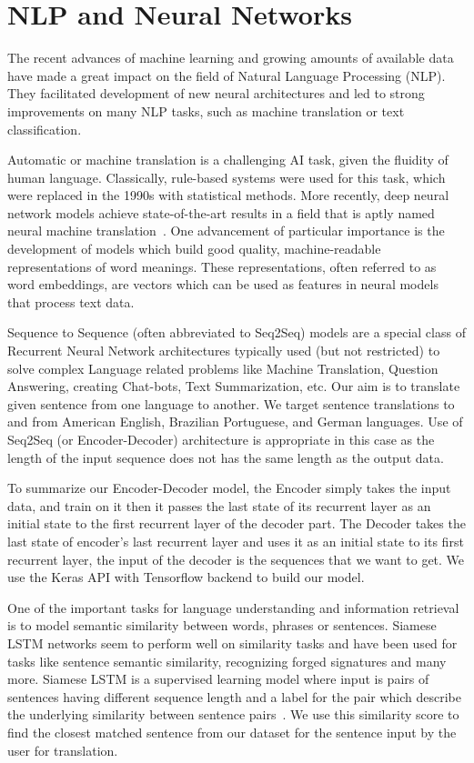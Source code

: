 \documentclass[runningheads]{llncs}
\begin{document}
	\section{NLP and Neural Networks}
	The recent advances of machine learning and growing amounts of available data have made a great impact on the field of  Natural Language Processing (NLP). They facilitated development of new neural architectures and led to strong improvements on many NLP tasks, such as machine translation or text classification. 
	
	Automatic or machine translation is a challenging AI task, given the fluidity of human language. Classically, rule-based systems were used for this task, which were replaced in the 1990s with statistical methods. More recently, deep neural network models achieve state-of-the-art results in a field that is aptly named neural machine translation~\cite{ref_url6}.
	One advancement of particular importance is the development of models which build good quality, machine-readable representations of word meanings. These representations, often referred to as word embeddings, are vectors which can be used as features in neural models that process text data.
	
	Sequence to Sequence (often abbreviated to Seq2Seq) models are a special class of Recurrent Neural Network architectures typically used (but not restricted) to solve complex Language related problems like Machine Translation, Question Answering, creating Chat-bots, Text Summarization, etc. Our aim is to translate given sentence from one language to another. We target sentence translations to and from American English, Brazilian Portuguese, and German languages. Use of Seq2Seq (or Encoder-Decoder) architecture is appropriate in this case as the length of the input sequence  does not has the same length as the output data.
	
	To summarize our Encoder-Decoder model, the Encoder simply takes the input data, and train on it then it passes the last state of its recurrent layer as an initial state to the first recurrent layer of the decoder part. The Decoder takes the last state of encoder’s last recurrent layer and uses it as an initial state to its first recurrent layer, the input of the decoder is the sequences that we want to get. We use the Keras API with Tensorflow backend to build our model.
	
	One of the important tasks for language understanding and information retrieval~\cite{ref_url7} is to model semantic similarity between words, phrases or sentences. Siamese LSTM networks seem to perform well on similarity tasks and have been used for tasks like sentence semantic similarity, recognizing forged signatures and many more.
	Siamese LSTM is a supervised learning model where input is pairs of sentences having different sequence length and a label for the pair which describe the underlying similarity between sentence pairs~\cite{ref_url8}. We use this similarity score to find the closest matched sentence from our dataset for the sentence input by the user for translation.
	
\end{document}
